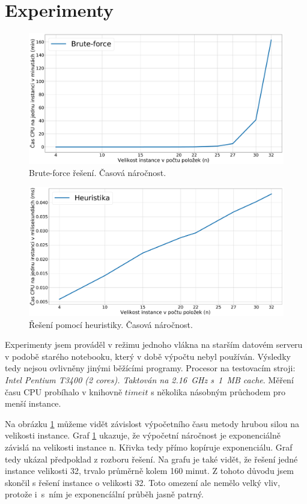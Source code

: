 \documentclass[11pt]{article}
\begin{document}
\section{Experimenty}
\begin{figure}\centering
	\includegraphics[scale=0.25]{img/1}
 	\caption[1]{Brute-force řešení. Časová náročnost.}\label{fig:1}
 \end{figure} 	
 \begin{figure}\centering
	\includegraphics[scale=0.25]{img/2}
 	\caption[2]{Řešení pomocí heuristiky. Časová náročnost.}\label{fig:2}
 \end{figure} 	
 
Experimenty jsem prováděl v režimu jednoho vlákna na starším datovém serveru v podobě starého notebooku, který v době výpočtu nebyl používán. Výsledky tedy nejsou ovlivněny jinými běžícími programy. Procesor na testovacím stroji: \textit{Intel Pentium T3400 (2 cores). Taktován na 2.16~GHz s~1~MB cache}.
Měření času CPU probíhalo v knihovně $timeit$ s několika násobným průchodem pro menší instance.

Na obrázku \ref{fig:1} můžeme vidět závislost výpočetního času metody hrubou silou na velikosti instance. Graf \ref{fig:1} ukazuje, že výpočetní náročnost je exponenciálně závislá na velikosti instance n. Křivka tedy přímo kopíruje exponenciálu. Graf tedy ukázal předpoklad z rozboru řešení. Na grafu je také vidět, že řešení jedné instance velikosti 32, trvalo průměrně kolem 160 minut. Z tohoto důvodu jsem skončil s řešení instance o velikosti 32. Toto omezení ale nemělo velký vliv, protože i~s~ním je exponencíální průběh jasně patrný.
\end{document}
